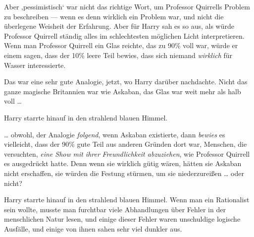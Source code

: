 Aber ‚pessimistisch‘ war nicht das richtige Wort, um Professor Quirrells Problem zu beschreiben — wenn es denn wirklich ein Problem war, und nicht die überlegene Weisheit der Erfahrung. Aber für Harry sah es so aus, als würde Professor Quirrell ständig alles im schlechtesten möglichen Licht interpretieren. Wenn man Professor Quirrell ein Glas reichte, das zu 90\% voll war, würde er einem sagen, dass der 10\% leere Teil bewies, dass sich niemand \emph{wirklich} für Wasser interessierte.

Das war eine sehr gute Analogie, jetzt, wo Harry darüber nachdachte. Nicht das ganze magische Britannien war wie Askaban, das Glas war weit mehr als halb voll …

Harry starrte hinauf in den strahlend blauen Himmel.

… obwohl, der Analogie \emph{folgend}, wenn Askaban existierte, dann \emph{bewies} es vielleicht, dass der 90\% gute Teil aus anderen Gründen dort war, Menschen, die versuchten, \emph{eine Show} \emph{mit ihrer} \emph{Freundlichkeit abzuziehen}, wie Professor Quirrell es ausgedrückt hatte. Denn wenn sie wirklich gütig wären, hätten sie Askaban nicht erschaffen, sie würden die Festung stürmen, um sie niederzureißen … oder nicht?

Harry starrte hinauf in den strahlend blauen Himmel. Wenn man ein Rationalist sein wollte, musste man furchtbar viele Abhandlungen über Fehler in der menschlichen Natur lesen, und einige dieser Fehler waren unschuldige logische Ausfälle, und einige von ihnen sahen sehr viel dunkler aus.

